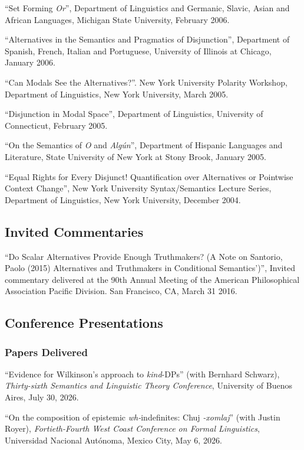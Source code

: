 \documentclass[11pt]{article}
\begin{document}
``Set Forming \textit{Or}'', Department of Linguistics and Germanic, Slavic, Asian and African Languages, Michigan State University, February 2006.

``Alternatives in the Semantics and Pragmatics of Disjunction'', Department of Spanish, French, Italian and Portuguese, University of Illinois at Chicago, January 2006. 

``Can Modals See the Alternatives?''. New York University Polarity Workshop, Department of Linguistics, New York University, March 2005. 

``Disjunction in Modal Space'', Department of Linguistics, University of Connecticut, February 2005. 


``On the Semantics of \textit{O} and \textit{Alg\'un}'', Department of Hispanic Languages and Literature, State University of New York at Stony Brook, January 2005. 
 
``Equal Rights for Every Disjunct! Quantification over Alternatives or Pointwise Context Change'', New York University Syntax/Semantics Lecture Series, Department of Linguistics, New York University, December 2004.


\subsection*{Invited Commentaries}

``Do Scalar Alternatives Provide Enough Truthmakers? (A Note on Santorio, Paolo (2015) Alternatives and Truthmakers in Conditional Semantics')'', Invited commentary delivered at the 90th Annual Meeting of the American Philosophical Association Pacific Division. San Francisco, CA, March 31 2016. 


\subsection*{Conference Presentations}


\subsubsection*{Papers Delivered}

``Evidence for Wilkinson's approach to \textit{kind}-DPs'' (with Bernhard Schwarz), \textit{Thirty-sixth Semantics and Linguistic Theory Conference}, University of Buenos Aires, 
July 30, 2026.


``On the composition of epistemic \textit{wh-}indefinites: Chuj \textit{-xomlaj}'' (with Justin Royer), \textit{Fortieth-Fourth West Coast Conference on Formal Linguistics}, Universidad Nacional Aut\'onoma, Mexico City, May 6, 2026.
\end{document}
